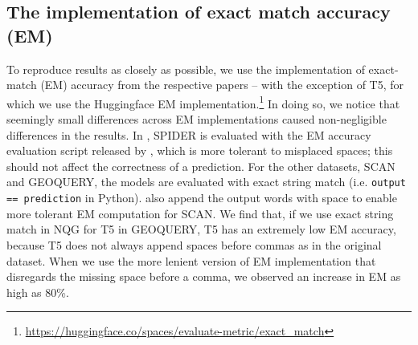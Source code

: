 \subsection{The implementation of exact match accuracy (EM)}
\label{sec:em-amb}
To reproduce results as closely as possible, we use the implementation of exact-match (EM) accuracy from the respective papers -- with the exception of T5, for which we use the Huggingface EM implementation.\footnote{\url{https://huggingface.co/spaces/evaluate-metric/exact_match}}
In doing so, we notice that seemingly small differences across EM implementations caused non-negligible differences in the results.
In \cite{shaw-etal-2021-compositional}, SPIDER is evaluated with the EM accuracy evaluation script released by \cite{yu2018spider}, which is more tolerant to misplaced spaces; this should not affect the correctness of a prediction.
For the other datasets, SCAN and GEOQUERY, the models are evaluated with exact string match (i.e. \texttt{output == prediction} in Python).
\cite{kim2021sequencetosequence} also append the output words with space to enable more tolerant EM computation for SCAN.
We find that, if we use exact string match in NQG for T5 in GEOQUERY, T5 has an extremely low EM accuracy, because T5 does not always append spaces before commas as in the original dataset. 
When we use the more lenient version of EM implementation that disregards the missing space before a comma, we observed an increase in EM as high as 80\%.


